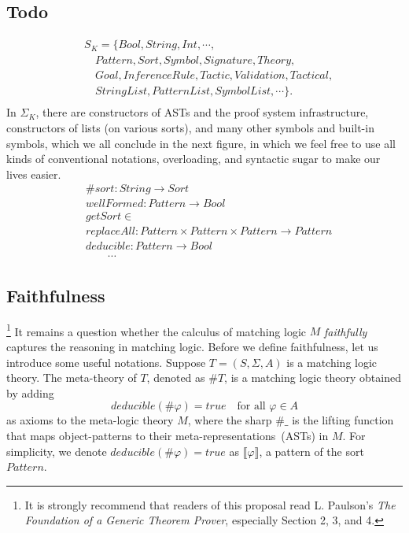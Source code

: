 \documentclass[UTF8]{article}
\theoremstyle{plain}
\theoremstyle{definition}
\theoremstyle{remark}
\newcommand{\Bracket}[1]
    {\llbracket#1\rrbracket}
\begin{document}
\subsection{Todo}
\begin{align*}
&S_K = \{\mathit{Bool}, \mathit{String}, \mathit{Int}, \cdots, \\
&\quad \mathit{Pattern}, \mathit{Sort}, \mathit{Symbol}, \mathit{Signature}, 
\mathit{Theory}, \\
&\quad \mathit{Goal}, \mathit{InferenceRule}, \mathit{Tactic}, 
\mathit{Validation}, \mathit{Tactical}, \\
&\quad \mathit{StringList}, \mathit{PatternList}, \mathit{SymbolList}, \cdots 
\}. \\
\end{align*}
In $\Sigma_K$, there are constructors of ASTs and the proof system 
infrastructure, constructors of lists (on various sorts), and many other 
symbols and built-in symbols, which we all conclude in the next figure, in which
we feel free to use all kinds of conventional notations, overloading, and 
syntactic sugar to make our lives easier. 
\begin{align*}
&\mathit{\#sort} \colon \mathit{String} \to \mathit{Sort} \\
&\mathit{wellFormed} \colon \mathit{Pattern} \to \mathit{Bool} \\
&\mathit{getSort} \in  \\
&\mathit{replaceAll} \colon \mathit{Pattern} \times \mathit{Pattern} \times 
\mathit{Pattern} \to \mathit{Pattern} \\
&\mathit{deducible} \colon \mathit{Pattern} \to \mathit{Bool} \\
&\qquad \cdots
\end{align*}

\subsection{Faithfulness}
\footnote{It is strongly recommend that readers of this proposal read L. 
	Paulson's \emph{The Foundation of a Generic Theorem Prover}, especially 
	Section 
	2, 3, and 4.}
It remains a question whether the calculus of matching logic $M$ \emph{faithfully}
captures the reasoning in matching logic. 
Before we define faithfulness, let us introduce some useful notations.
Suppose $T = (S, \Sigma, A)$ is a matching logic theory.
The meta-theory of $T$, denoted as $\#T$, is a matching logic theory obtained by adding
$$
\textit{deducible}\left(\#{\varphi}\right) = true
\quad \text{for all $\varphi \in A$}
$$
as axioms to the meta-logic theory $M$,
where the sharp $\#\_$ is the lifting function that maps object-patterns 
to their meta-representations~(ASTs) in $M$.
For simplicity, we denote $\textit{deducible}\left(\#{\varphi}\right) = true$ as $\Bracket{\varphi}$, a pattern of the sort $\mathit{Pattern}$.
\end{document}
